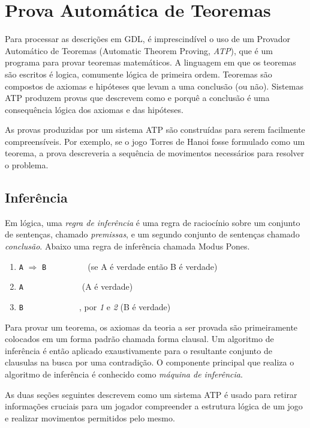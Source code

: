 \chapter{Prova Automática de Teoremas}
Para processar as descrições em GDL, é imprescindível o uso de um Provador Automático de Teoremas (Automatic Theorem Proving, \textit{ATP}), que é um programa para provar teoremas matemáticos. A linguagem em que os teoremas são escritos é logica, comumente lógica de primeira ordem. Teoremas são compostos de axiomas e hipóteses que levam a uma conclusão  (ou não). Sistemas ATP produzem provas que descrevem como e porquê a conclusão é uma consequência lógica dos axiomas e das hipóteses.

As provas produzidas por um sistema ATP são construídas para serem facilmente compreensíveis. Por exemplo, se o jogo Torres de Hanoi fosse formulado como um teorema, a prova descreveria a sequência de movimentos necessários para resolver o problema.

\section{Inferência}
Em lógica, uma \textit{regra de inferência} é uma regra de raciocínio sobre um conjunto de sentenças, chamado \textit{premissas}, e um segundo conjunto de sentenças chamado \textit{conclusão}. Abaixo uma regra de inferência chamada Modus Pones.
\begin{enumerate}
  \singlespacing
  \item \verb|A| $\Rightarrow$ \verb|B         | (se A é verdade então B é verdade)
  \item \verb|A             | (A é verdade)
  \item \verb|B             |, por \textit{1} e \textit{2} (B é verdade)
\end{enumerate}
 \doublespacing

Para provar um teorema, os axiomas da teoria a ser provada são primeiramente colocados em um forma padrão chamada forma clausal. Um algoritmo de inferência é então aplicado exaustivamente para o resultante conjunto de clausulas na busca por uma contradição. O componente principal que realiza o algoritmo de inferência é conhecido como \textit{máquina de inferência}.

As duas seções seguintes descrevem como um sistema ATP é usado para retirar informações cruciais para um jogador compreender a estrutura lógica de um jogo e realizar movimentos permitidos pelo mesmo.

